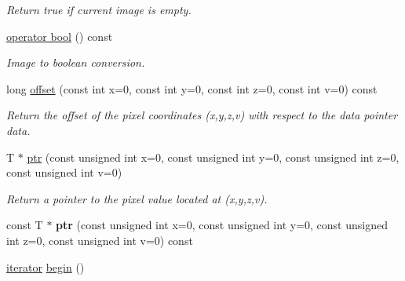 \begin{DoxyCompactItemize}
\begin{DoxyCompactList}\small\item\em Return {\ttfamily true} if current image is empty. \end{DoxyCompactList}\item 
\hypertarget{structcimg__library_1_1_c_img_ab6654892be343b8ae94d1927b71720e9}{\hyperlink{structcimg__library_1_1_c_img_ab6654892be343b8ae94d1927b71720e9}{operator bool} () const }\label{structcimg__library_1_1_c_img_ab6654892be343b8ae94d1927b71720e9}

\begin{DoxyCompactList}\small\item\em Image to boolean conversion. \end{DoxyCompactList}\item 
long \hyperlink{structcimg__library_1_1_c_img_a266ad9e6e5d13058af75966b7d7e3ad9}{offset} (const int x=0, const int y=0, const int z=0, const int v=0) const 
\begin{DoxyCompactList}\small\item\em Return the offset of the pixel coordinates ({\ttfamily x},{\ttfamily y},{\ttfamily z},{\ttfamily v}) with respect to the data pointer {\ttfamily data}. \end{DoxyCompactList}\item 
T $\ast$ \hyperlink{structcimg__library_1_1_c_img_af19c37d44b9fce37ad7c4a9ad247d1a0}{ptr} (const unsigned int x=0, const unsigned int y=0, const unsigned int z=0, const unsigned int v=0)
\begin{DoxyCompactList}\small\item\em Return a pointer to the pixel value located at ({\ttfamily x},{\ttfamily y},{\ttfamily z},{\ttfamily v}). \end{DoxyCompactList}\item 
\hypertarget{structcimg__library_1_1_c_img_acd0775163aa95d0b4317f98063167c9f}{const T $\ast$ {\bfseries ptr} (const unsigned int x=0, const unsigned int y=0, const unsigned int z=0, const unsigned int v=0) const }\label{structcimg__library_1_1_c_img_acd0775163aa95d0b4317f98063167c9f}

\item 
\hypertarget{structcimg__library_1_1_c_img_a949050ed420affec534b8aca29021846}{\hyperlink{structcimg__library_1_1_c_img_a3ff3f07802e67c4ba930427ea45655c8}{iterator} \hyperlink{structcimg__library_1_1_c_img_a949050ed420affec534b8aca29021846}{begin} ()}\label{structcimg__library_1_1_c_img_a949050ed420affec534b8aca29021846}


\end{DoxyCompactItemize}
